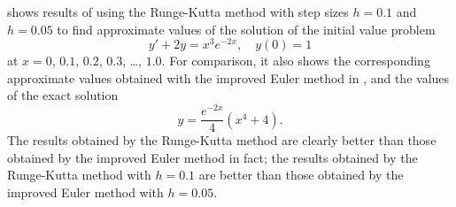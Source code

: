 \begin{example}\label{example:3.3.2}
 shows results of using the Runge-Kutta method
with step sizes $h=0.1$ and $h=0.05$ to find approximate values of
the solution of the initial value problem
\[
y'+2y=x^3e^{-2x},\quad y(0)=1
\]
at $x=0$, $0.1$, $0.2$, $0.3$, \dots, $1.0$. For comparison, it also shows
the
corresponding approximate values obtained with the improved Euler
method in , and the values of the exact
solution
\[
y=\frac{e^{-2x}}{4}(x^4+4).
\]
The results obtained by the Runge-Kutta method are clearly better
than those obtained by the improved Euler method   in fact; the results
obtained by the Runge-Kutta method with $h=0.1$ are better than those
obtained by the improved Euler method with $h=0.05$.
\end{example}



